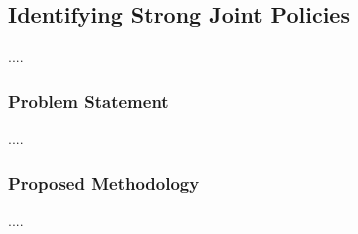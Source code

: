 \subsection{Identifying Strong Joint Policies}

....

\subsubsection{Problem Statement}

\begin{flushleft}
    ....
\end{flushleft}

\subsubsection{Proposed Methodology}

\begin{flushleft}
    ....
\end{flushleft}